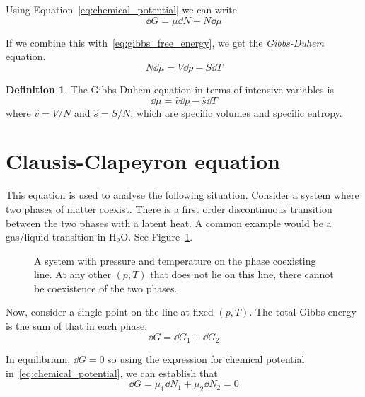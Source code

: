\documentclass[12pt,chapterprefix=false,dvipsnames]{scrbook}
\theoremstyle{dotless}
\theoremstyle{definition}
\newtheorem{protodefinition}{Definition}[section]
\newenvironment{definition}
{\colorlet{shadecolor}{black!15}\begin{shaded}\begin{protodefinition}}
			{\end{protodefinition}\end{shaded}}
\begin{document}
Using Equation~\ref{eq:chemical_potential} we can write
\begin{equation}
	\dd{G} = \mu \dd{N} +
	N\dd{\mu}
\end{equation}

If we combine this with~\ref{eq:gibbs_free_energy}, we get the
\textit{Gibbs-Duhem} equation.
\begin{equation}
	N\dd{\mu} = V\dd{p} -
	S\dd{T}
\end{equation}

\begin{definition}
	The Gibbs-Duhem equation in terms of intensive variables is
	\begin{equation}
		\label{eq:gibbs-duhem}
		\dd{\mu} =
		\hat{v}\dd{p} -
		\hat{s}\dd{T}
	\end{equation}
	where $ \hat{v} = V/N $ and $ \hat{s} = S/N $, which
	are specific volumes and specific entropy.
\end{definition}

\section{Clausis-Clapeyron equation}%
\label{sec:clausis_clapeyron_equation}

This equation is used to analyse the following situation.
Consider a system where two phases of matter coexist. There is a
first order discontinuous transition between the two phases with
a latent heat. A common example would be a gas/liquid transition
in $\mathrm{H}_2\mathrm{O}$. See Figure~\ref{fig:clausis-clapeyron}.

\begin{figure}[htpb]
	\centering
	
	\caption{A system with pressure and temperature on the phase coexisting
		line. At any other $(p,T)$ that does not lie on
		this line, there cannot be coexistence of the two phases.}%
	\label{fig:clausis-clapeyron}
\end{figure}

Now, consider a single point on the line at fixed
$(p,T)$. The total Gibbs energy is the sum of
that in each phase.
\begin{equation}
	\dd{G} = \dd{G}_1 +
	\dd{G}_2
\end{equation}

In equilibrium, $\dd{G} = 0$ so using the expression
for chemical potential in~\ref{eq:chemical_potential}, we can
establish that
\begin{equation}
	\dd{G} = \mu_1 \dd{N}_1 +
	\mu_2 \dd{N}_2 = 0
\end{equation}
\end{document}
